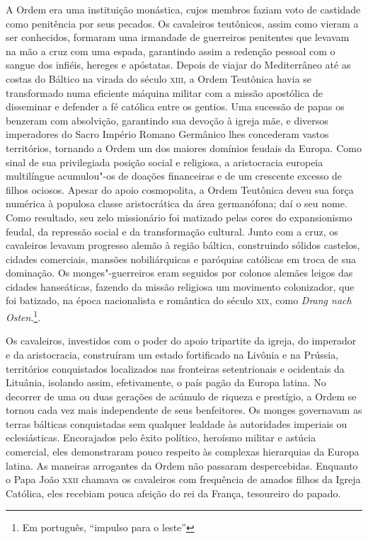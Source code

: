 A Ordem era uma instituição monástica, cujos membros faziam voto de
castidade como penitência por seus pecados. Os cavaleiros teutônicos,
assim como vieram a ser conhecidos, formaram uma irmandade de guerreiros
penitentes que levavam na mão a cruz com uma espada, garantindo assim a
redenção pessoal com o sangue dos infiéis, hereges e apóstatas. Depois
de viajar do Mediterrâneo até as costas do Báltico na virada do século
\textsc{xiii}, a Ordem Teutônica havia se transformado numa eficiente máquina
militar com a missão apostólica de disseminar e defender a fé católica
entre os gentios. Uma sucessão de papas os benzeram com absolvição,
garantindo sua devoção à igreja mãe, e diversos imperadores do Sacro
Império Romano Germânico lhes concederam vastos territórios, tornando a
Ordem um dos maiores domínios feudais da Europa. Como sinal de sua
privilegiada posição social e religiosa, a aristocracia europeia
multilíngue acumulou"-os de doações financeiras e de um crescente excesso
de filhos ociosos. Apesar do apoio cosmopolita, a Ordem Teutônica deveu
sua força numérica à populosa classe aristocrática da área germanófona;
daí o seu nome. Como resultado, seu zelo missionário foi matizado pelas
cores do expansionismo feudal, da repressão social e da transformação
cultural. Junto com a cruz, os cavaleiros levavam progresso alemão à
região báltica, construindo sólidos castelos, cidades comerciais,
mansões nobiliárquicas e paróquias católicas em troca de sua dominação.
Os monges"-guerreiros eram seguidos por colonos alemães leigos das
cidades hanseáticas, fazendo da missão religiosa um movimento
colonizador, que foi batizado, na época nacionalista e romântica do
século \textsc{xix}, como \textit{Drang nach Osten}.\footnote{Em português, ``impulso para o leste''}.

Os cavaleiros, investidos com o poder do apoio tripartite da igreja, do
imperador e da aristocracia, construíram um estado fortificado na
Livônia e na Prússia, territórios conquistados localizados nas
fronteiras setentrionais e ocidentais da Lituânia, isolando assim,
efetivamente, o país pagão da Europa latina. No decorrer de uma ou duas
gerações de acúmulo de riqueza e prestígio, a Ordem se tornou cada vez
mais independente de seus benfeitores. Os monges governavam as terras
bálticas conquistadas sem qualquer lealdade às autoridades imperiais ou
eclesiásticas. Encorajados pelo êxito político, heroísmo militar e
astúcia comercial, eles demonstraram pouco respeito às complexas
hierarquias da Europa latina. As maneiras arrogantes da Ordem não
passaram despercebidas. Enquanto o Papa João \textsc{xxii} chamava os cavaleiros
com frequência de amados filhos da Igreja Católica, eles recebiam pouca
afeição do rei da França, tesoureiro do papado.

